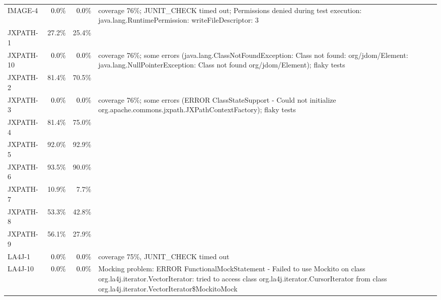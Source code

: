 \begin{tabular}{ l rrrrrrr rrrrrrrr}
IMAGE-4 & \cellcolor{light-gray} \textcolor{black}{0.0}\% &
                                                            \cellcolor{light-gray}
                                                            \textcolor{black}{0.0}\% 
& \multicolumn{13}{l}{coverage 76\%; JUNIT\_CHECK timed out; Permissions denied during test execution: java.lang.RuntimePermission: writeFileDescriptor: 3}
  \\ 
JXPATH-1 & 27.2\% & 25.4\%\\ 
JXPATH-10 & \cellcolor{light-gray} \textcolor{black}{0.0}\% &
                                                              \cellcolor{light-gray}
                                                              \textcolor{black}{0.0}\%
 & \multicolumn{13}{l}{coverage 76\%; some errors (java.lang.ClassNotFoundException:
   Class not found: org/jdom/Element: java.lang.NullPointerException:
   Class not found org/jdom/Element); flaky tests}\\ 
JXPATH-2 & 81.4\% & 70.5\%\\ 
JXPATH-3 & \cellcolor{light-gray} \textcolor{black}{0.0}\% &
                                                             \cellcolor{light-gray}
                                                             \textcolor{black}{0.0}\% 
 & \multicolumn{13}{l}{coverage 76\%; some errors (ERROR ClassStateSupport - Could not initialize org.apache.commons.jxpath.JXPathContextFactory); flaky tests}\\ 
JXPATH-4 & 81.4\% & 75.0\%\\ 
JXPATH-5 & 92.0\% & 92.9\%\\ 
JXPATH-6 & 93.5\% & 90.0\%\\ 
JXPATH-7 & 10.9\% & 7.7\%\\ 
JXPATH-8 & 53.3\% & 42.8\%\\ 
JXPATH-9 & 56.1\% & 27.9\%\\ 
LA4J-1 & \cellcolor{light-gray} \textcolor{black}{0.0}\% &
                                                           \cellcolor{light-gray}
                                                           \textcolor{black}{0.0}\%
 & \multicolumn{13}{l}{coverage 75\%, JUNIT\_CHECK timed out}\\ 
LA4J-10 & \cellcolor{light-gray} \textcolor{black}{0.0}\% &
                                                            \cellcolor{light-gray}
                                                            \textcolor{black}{0.0}\%
 & \multicolumn{13}{l}{Mocking problem: ERROR FunctionalMockStatement - Failed to use Mockito on class org.la4j.iterator.VectorIterator: tried to access class org.la4j.iterator.CursorIterator from class org.la4j.iterator.VectorIterator\$MockitoMock}\\ 

\end{tabular}
